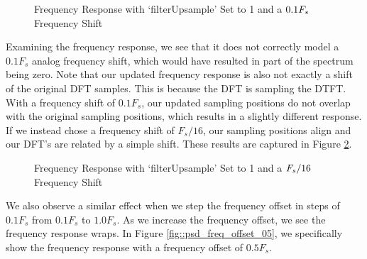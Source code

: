\documentclass{article}
\begin{document}
\begin{figure}[H]
	\centerline{}
	\caption{Frequency Response with `filterUpsample' Set to 1 and a $\protect{0.1F_s}$ Frequency Shift}
	\label{fig::psd_upsample_1}
\end{figure}

\noindent Examining the frequency response, we see that it does not correctly model a $0.1F_s$ analog frequency shift, which would have resulted in part of the spectrum being zero. Note that our updated frequency response is also not exactly a shift of the original DFT samples. This is because the DFT is sampling the DTFT. With a frequency shift of $0.1F_s$, our updated sampling positions do not overlap with the original sampling positions, which results in a slightly different response. If we instead chose a frequency shift of $F_s/16$, our sampling positions align and our DFT's are related by a simple shift. These results are captured in Figure \ref{fig::psd_upsample_1_mod_shift}.

\begin{figure}[H]
	\centerline{}
	\caption{Frequency Response with `filterUpsample' Set to 1 and a $\protect{F_s/16}$ Frequency Shift}
	\label{fig::psd_upsample_1_mod_shift}
\end{figure}

\noindent We also observe a similar effect when we step the frequency offset in steps of $0.1F_s$ from $0.1F_s$ to $1.0F_s$. As we increase the frequency offset, we see the frequency response wraps. In Figure \ref{fig::psd_freq_offset_05}, we specifically show the frequency response with a frequency offset of $0.5F_s$. 
\end{document}
